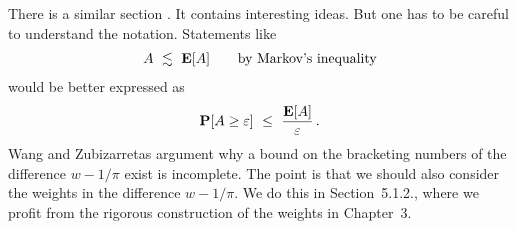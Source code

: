 \begin{remark}
  There is a similar section \cite[page 27-28]{Wang2019}.
  It contains interesting ideas. But one has to be careful to understand the notation.
  Statements like
  \begin{align*}
    A\ \lesssim\  \mathbf{E}[A] \qquad
    \text{by Markov's inequality}
  \end{align*}
  would be better expressed as
  \begin{align*}
    \P[A\ge \varepsilon]
    \ 
    \le 
    \ 
    \frac
    {\E[A]}
    {\varepsilon}
    \,.
  \end{align*}
  Wang and Zubizarretas argument why a bound on the bracketing numbers of the difference $w-1/\pi$ exist is incomplete. 
  The point is that we should also consider the weights in the difference $w-1/\pi$. 
  We do this in Section~5.1.2., where we profit from the rigorous construction of the weights in Chapter~3.
\end{remark}


